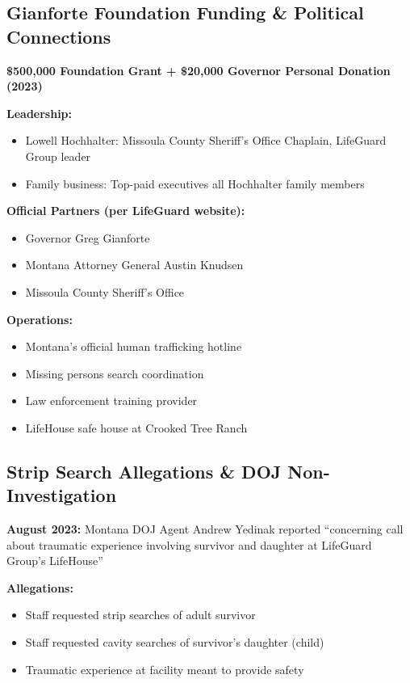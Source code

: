 \documentclass[11pt,letterpaper]{article}
\begin{document}
\subsection{Gianforte Foundation Funding \& Political Connections}

\textbf{\$500,000 Foundation Grant + \$20,000 Governor Personal Donation (2023)}

\textbf{Leadership:}
\begin{itemize}[leftmargin=*]
\item Lowell Hochhalter: Missoula County Sheriff's Office Chaplain, LifeGuard Group leader
\item Family business: Top-paid executives all Hochhalter family members
\end{itemize}

\textbf{Official Partners (per LifeGuard website):}
\begin{itemize}[leftmargin=*]
\item Governor Greg Gianforte
\item Montana Attorney General Austin Knudsen
\item Missoula County Sheriff's Office
\end{itemize}

\textbf{Operations:}
\begin{itemize}[leftmargin=*]
\item Montana's official human trafficking hotline
\item Missing persons search coordination
\item Law enforcement training provider
\item LifeHouse safe house at Crooked Tree Ranch
\end{itemize}

\subsection{Strip Search Allegations \& DOJ Non-Investigation}

\textbf{August 2023:} Montana DOJ Agent Andrew Yedinak reported ``concerning call about traumatic experience involving survivor and daughter at LifeGuard Group's LifeHouse''

\textbf{Allegations:}
\begin{itemize}[leftmargin=*]
\item Staff requested strip searches of adult survivor
\item Staff requested cavity searches of survivor's daughter (child)
\item Traumatic experience at facility meant to provide safety
\end{itemize}
\end{document}
